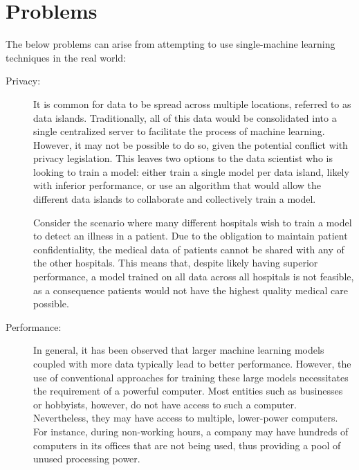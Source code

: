 \section{Problems} \label{problems}
The below problems can arise from attempting to use single-machine learning techniques in the real world:
\begin{description}
	\item[Privacy:] It is common for data to be spread across multiple locations, referred to as data islands. Traditionally, all of this data would be consolidated into a single centralized server to facilitate the process of machine learning. However, it may not be possible to do so, given the potential conflict with privacy legislation. This leaves two options to the data scientist who is looking to train a model: either train a single model per data island, likely with inferior performance, or use an algorithm that would allow the different data islands to collaborate and collectively train a model.
	
	Consider the scenario where many different hospitals wish to train a model to detect an illness in a patient. Due to the obligation to maintain patient confidentiality, the medical data of patients cannot be shared with any of the other hospitals. This means that, despite likely having superior performance, a model trained on all data across all hospitals is not feasible, as a consequence patients would not have the highest quality medical care possible.
	
	\item[Performance:] In general, it has been observed that larger machine learning models coupled with more data typically lead to better performance. However, the use of conventional approaches for training these large models necessitates the requirement of a powerful computer. Most entities such as businesses or hobbyists, however, do not have access to such a computer. Nevertheless, they may have access to multiple, lower-power computers. For instance, during non-working hours, a company may have hundreds of computers in its offices that are not being used, thus providing a pool of unused processing power.
\end{description}

